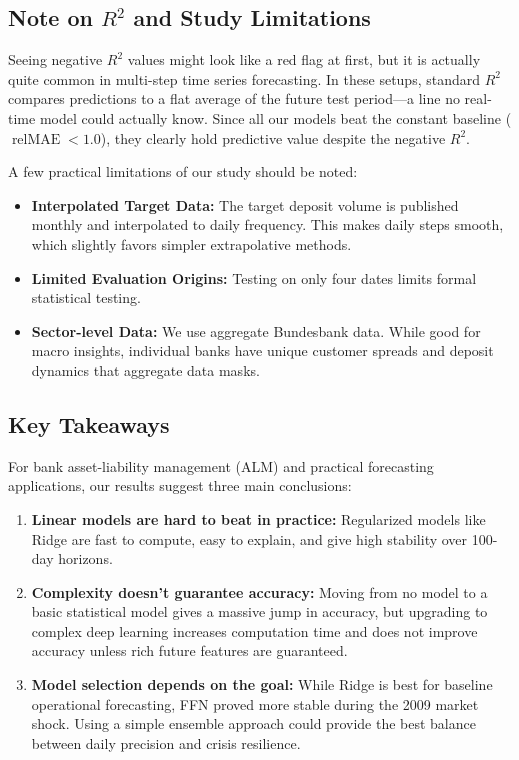 \documentclass[11pt,a4paper]{article}
\begin{document}
\subsection{Note on $R^2$ and Study Limitations}
Seeing negative $R^2$ values might look like a red flag at first, but it is actually quite common in multi-step time series forecasting. In these setups, standard $R^2$ compares predictions to a flat average of the future test period—a line no real-time model could actually know. Since all our models beat the constant baseline ($\operatorname{relMAE} < 1.0$), they clearly hold predictive value despite the negative $R^2$.

A few practical limitations of our study should be noted:
\begin{itemize}
    \item \textbf{Interpolated Target Data:} The target deposit volume is published monthly and interpolated to daily frequency. This makes daily steps smooth, which slightly favors simpler extrapolative methods.
    \item \textbf{Limited Evaluation Origins:} Testing on only four dates limits formal statistical testing.
    \item \textbf{Sector-level Data:} We use aggregate Bundesbank data. While good for macro insights, individual banks have unique customer spreads and deposit dynamics that aggregate data masks.
\end{itemize}

\subsection{Key Takeaways}
For bank asset-liability management (ALM) and practical forecasting applications, our results suggest three main conclusions:
\begin{enumerate}
    \item \textbf{Linear models are hard to beat in practice:} Regularized models like Ridge are fast to compute, easy to explain, and give high stability over 100-day horizons.
    \item \textbf{Complexity doesn't guarantee accuracy:} Moving from no model to a basic statistical model gives a massive jump in accuracy, but upgrading to complex deep learning increases computation time and does not improve accuracy unless rich future features are guaranteed.
    \item \textbf{Model selection depends on the goal:} While Ridge is best for baseline operational forecasting, FFN proved more stable during the 2009 market shock. Using a simple ensemble approach could provide the best balance between daily precision and crisis resilience.
\end{enumerate}
\end{document}
